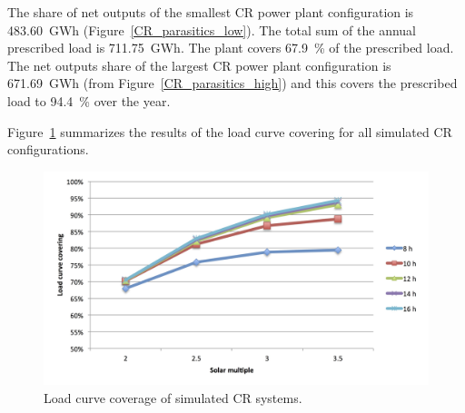 The share of net outputs of the smallest CR power plant configuration is \SI{483.60}{GWh} (Figure~\ref{CR_parasitics_low}). The total sum of the annual prescribed load is \SI{711.75}{GWh}. The plant covers \SI{67.9}{\percent} of the prescribed load. The net outputs share of the largest CR power plant configuration is \SI{671.69}{GWh} (from Figure~\ref{CR_parasitics_high}) and this covers the prescribed load to \SI{94.4}{\percent} over the year.


Figure~\ref{CR_LCCF} summarizes the results of the load curve covering for all simulated CR configurations.


\begin{figure}[htbp]  
\centering
\includegraphics[width=1\linewidth]{FIG/CR_LCCF}
\caption[Load curve coverage of simulated CR systems.]{Load curve coverage of simulated CR systems.}\label{CR_LCCF}
\end{figure}

